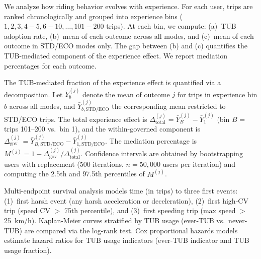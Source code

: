 We analyze how riding behavior evolves with experience. For each user, trips are ranked chronologically and grouped into experience bins ($1, 2, 3, 4{-}5, 6{-}10, \ldots, 101{-}200$ trips). At each bin, we compute: (a)~TUB adoption rate, (b)~mean of each outcome across all modes, and (c)~mean of each outcome in STD/ECO modes only. The gap between (b) and (c) quantifies the TUB-mediated component of the experience effect. We report mediation percentages for each outcome.

The TUB-mediated fraction of the experience effect is quantified via a decomposition. Let $\bar{Y}^{(j)}_b$ denote the mean of outcome $j$ for trips in experience bin $b$ across all modes, and $\bar{Y}^{(j)}_{b,\text{STD/ECO}}$ the corresponding mean restricted to STD/ECO trips. The total experience effect is $\Delta^{(j)}_{\text{total}} = \bar{Y}^{(j)}_{B} - \bar{Y}^{(j)}_{1}$ (bin $B$ = trips 101--200 vs.\ bin 1), and the within-governed component is $\Delta^{(j)}_{\text{gov}} = \bar{Y}^{(j)}_{B,\text{STD/ECO}} - \bar{Y}^{(j)}_{1,\text{STD/ECO}}$. The mediation percentage is $M^{(j)} = 1 - \Delta^{(j)}_{\text{gov}} / \Delta^{(j)}_{\text{total}}$. Confidence intervals are obtained by bootstrapping users with replacement (500 iterations, $n = 50{,}000$ users per iteration) and computing the 2.5th and 97.5th percentiles of $M^{(j)}$.

Multi-endpoint survival analysis models time (in trips) to three first events: (1)~first harsh event (any harsh acceleration or deceleration), (2)~first high-CV trip (speed CV $>$ 75th percentile), and (3)~first speeding trip (max speed $>$ 25~km/h). Kaplan-Meier curves stratified by TUB usage (ever-TUB vs.\ never-TUB) are compared via the log-rank test. Cox proportional hazards models estimate hazard ratios for TUB usage indicators (ever-TUB indicator and TUB usage fraction).
